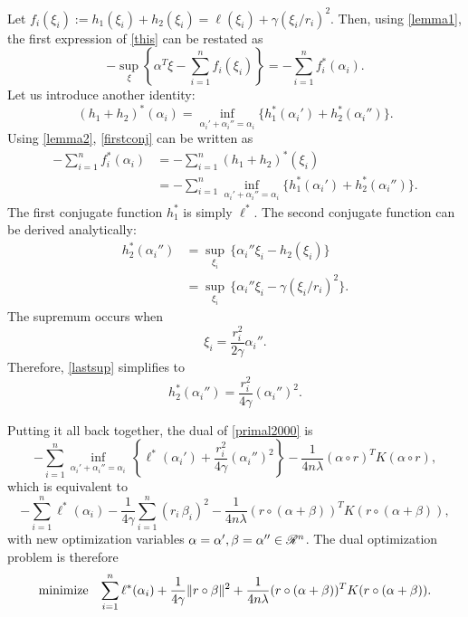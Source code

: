\documentclass{article}
\newcommand{\sumi}{\sum_{i=1}^n}
\begin{document}
Let $f_i(\xi_i) := h_1(\xi_i)+ h_2(\xi_i) = \ell(\xi_i) + \gamma(\xi_i/r_i)^2$. Then, using \eqref{lemma1},
the first expression of \eqref{this} can be restated as
\begin{equation}
  \label{firstconj}
  -\sup_\xi\left\{\alpha^T \xi - \sumi f_i(\xi_i)\right\} = -\sumi f_i^*(\alpha_i).
\end{equation}
Let us introduce another identity:
\begin{equation}
  \label{lemma2}
  (h_1+h_2)^*(\alpha_i) = \inf_{\alpha_i'+\alpha_i''=\alpha_i} \{h_1^*(\alpha_i') + h_2^*(\alpha_i'')\}.
\end{equation}
Using \eqref{lemma2}, \eqref{firstconj} can be written as
\begin{align}
  -\sumi f_i^*(\alpha_i) &= -\sumi (h_1+h_2)^*(\xi_i)\\
                    &= -\sumi \inf_{\alpha_i'+\alpha_i''=\alpha_i} \{h_1^*(\alpha_i') + h_2^*(\alpha_i'')\}.
\end{align}
The first conjugate function $h_1^*$ is simply $\ell^*$. The second conjugate function can be
derived analytically:
\begin{align}
  h_2^*(\alpha_i'') &= \sup_{\xi_i}\,\{\alpha_i''\xi_i - h_2(\xi_i)\}\\
               &= \sup_{\xi_i}\,\{\alpha_i''\xi_i - \gamma(\xi_i/r_i)^2\}\label{lastsup}.
\end{align}
The supremum occurs when
\begin{equation}
  \label{supconj}
  \xi_i = \frac{r_i^2}{2\gamma}\alpha_i''.
\end{equation}
Therefore, \eqref{lastsup} simplifies to
\begin{equation}
  h_2^*(\alpha_i'') = \frac{r_i^2}{4\gamma}(\alpha_i'')^2.
\end{equation}

Putting it all back together, the dual of \eqref{primal2000} is
\begin{equation}
  -\sumi \inf_{\alpha_i'+\alpha_i''=\alpha_i}\,\left\{\ell^*(\alpha_i') + \frac{r_i^2}{4\gamma}(\alpha_i'')^2\right\}  - \frac{1}{4n\lambda} (\alpha \circ r)^TK(\alpha \circ r),
\end{equation}
which is equivalent to
\begin{equation}
  -\sumi \ell^*(\alpha_i) - \frac{1}{4\gamma}\sumi (r_i\,\beta_i)^2 - \frac{1}{4n\lambda}(r \circ (\alpha+\beta))^TK(r \circ (\alpha+\beta)),
\end{equation}
with new optimization variables $\alpha=\alpha',\beta=\alpha''\in\mathscr{R}^n$. The dual optimization problem is
therefore
\begin{equation}
  \minimizeEquation{\sumi \ell^*(\alpha_i) + \frac{1}{4\gamma}\|r\circ\beta\|^2 + \frac{1}{4n\lambda}(r \circ (\alpha+\beta))^TK(r \circ (\alpha+\beta))}.
\end{equation}
\end{document}
